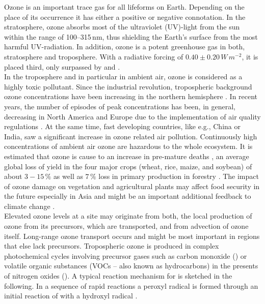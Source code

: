 \documentclass[gmd, manuscript]{copernicus}
\begin{document}
\introduction  %
\label{sec:intro}
Ozone is an important trace gas for all lifeforms on Earth. Depending on the place of its occurrence it has either a positive or negative connotation. In the stratosphere, ozone absorbs most of the ultraviolet (UV)-light from the sun within the range of 100--315\,\unit{nm}, thus shielding the Earth's surface from the most harmful UV-radiation. In addition, ozone is a potent greenhouse gas in both, stratosphere and troposphere. With a radiative forcing of $0.40 \pm 0.20\,\unit{W\,m^{-2}}$, it is placed third, only surpassed by  and  \citep[Chapter 8]{IPCC2013}.\\
In the troposphere and in particular in ambient air, ozone is considered as a highly toxic pollutant. Since the industrial revolution, tropospheric background ozone concentrations have been increasing in the northern hemisphere \citep[Chapter 2]{IPCC2013}. In recent years, the number of episodes of peak concentrations has been, in general, decreasing in North America and Europe due to the implementation of air quality regulations \citep[e.g.,][]{ESA:Fleming2018, ESA:Mills2018}. At the same time, fast developing countries, like e.g., China or India, saw a significant increase in ozone related air pollution. Continuously high concentrations of ambient air ozone are hazardous to the whole ecosystem. It is estimated that ozone is cause to an increase in pre-mature deaths \citep{WHO2008}, an average global loss of yield in the four major crops (wheat, rice, maize, and soybean) of about $3-15\,\unit{\%}$ \citep{PJ:Ainsworth2017} as well as $7\,\unit{\%}$ loss in primary production in forestry \citep{GCB:Wittig2009,EP:Matyssek2012}. The impact of ozone damage on vegetation and agricultural plants may affect food security in the future especially in Asia \citep{GCB:Tang2013,NCC:Tai2014,AE:Chuwah2015,GCB:Mills2018} and might be an important additional feedback to climate change \citep{Nat:Sitch2007}.\\
Elevated ozone levels at a site may originate from both, the local production of ozone from its precursors, which are transported, and from advection of ozone itself. Long-range ozone transport occurs and might be most important in regions that else lack precursors. Tropospheric ozone is produced in complex photochemical cycles involving precursor gases such as carbon monoxide () or volatile organic substances (VOCs -- also known as hydrocarbons) in the presents of nitrogen oxides (). A typical reaction mechanism for  is sketched in the following. In a sequence of rapid reactions a peroxyl radical  is formed through an initial reaction of  with a hydroxyl radical .
\end{document}
